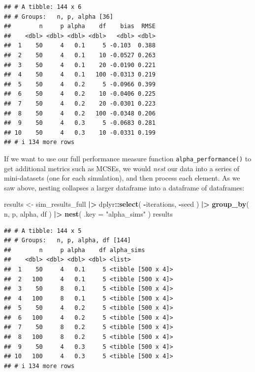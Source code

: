 \documentclass[
]{book}
\newenvironment{Shaded}{\begin{snugshade}}{\end{snugshade}}
\newcommand{\AttributeTok}[1]{\textcolor[rgb]{0.13,0.29,0.53}{#1}}
\newcommand{\FunctionTok}[1]{\textcolor[rgb]{0.13,0.29,0.53}{\textbf{#1}}}
\newcommand{\NormalTok}[1]{#1}
\newcommand{\OtherTok}[1]{\textcolor[rgb]{0.56,0.35,0.01}{#1}}
\newcommand{\SpecialCharTok}[1]{\textcolor[rgb]{0.81,0.36,0.00}{\textbf{#1}}}
\newcommand{\StringTok}[1]{\textcolor[rgb]{0.31,0.60,0.02}{#1}}
\begin{document}
\begin{verbatim}
## # A tibble: 144 x 6
## # Groups:   n, p, alpha [36]
##        n     p alpha    df    bias  RMSE
##    <dbl> <dbl> <dbl> <dbl>   <dbl> <dbl>
##  1    50     4   0.1     5 -0.103  0.388
##  2    50     4   0.1    10 -0.0527 0.263
##  3    50     4   0.1    20 -0.0190 0.221
##  4    50     4   0.1   100 -0.0313 0.219
##  5    50     4   0.2     5 -0.0966 0.399
##  6    50     4   0.2    10 -0.0406 0.225
##  7    50     4   0.2    20 -0.0301 0.223
##  8    50     4   0.2   100 -0.0348 0.206
##  9    50     4   0.3     5 -0.0683 0.281
## 10    50     4   0.3    10 -0.0331 0.199
## # i 134 more rows
\end{verbatim}

If we want to use our full performance measure function \texttt{alpha\_performance()} to get additional metrics such as MCSEs, we would \emph{nest} our data into a series of mini-datasets (one for each simulation), and then process each element.
As we saw above, nesting collapses a larger dataframe into a dataframe of dataframes:

\begin{Shaded}
\begin{Highlighting}[]
\NormalTok{results }\OtherTok{\textless{}{-}}\NormalTok{ sim\_results\_full }\SpecialCharTok{|\textgreater{}}
\NormalTok{  dplyr}\SpecialCharTok{::}\FunctionTok{select}\NormalTok{( }\SpecialCharTok{{-}}\NormalTok{iterations, }\SpecialCharTok{{-}}\NormalTok{seed ) }\SpecialCharTok{|\textgreater{}}
  \FunctionTok{group\_by}\NormalTok{( n, p, alpha, df ) }\SpecialCharTok{|\textgreater{}}
  \FunctionTok{nest}\NormalTok{( }\AttributeTok{.key =} \StringTok{"alpha\_sims"}\NormalTok{ )}
\NormalTok{results}
\end{Highlighting}
\end{Shaded}

\begin{verbatim}
## # A tibble: 144 x 5
## # Groups:   n, p, alpha, df [144]
##        n     p alpha    df alpha_sims        
##    <dbl> <dbl> <dbl> <dbl> <list>            
##  1    50     4   0.1     5 <tibble [500 x 4]>
##  2   100     4   0.1     5 <tibble [500 x 4]>
##  3    50     8   0.1     5 <tibble [500 x 4]>
##  4   100     8   0.1     5 <tibble [500 x 4]>
##  5    50     4   0.2     5 <tibble [500 x 4]>
##  6   100     4   0.2     5 <tibble [500 x 4]>
##  7    50     8   0.2     5 <tibble [500 x 4]>
##  8   100     8   0.2     5 <tibble [500 x 4]>
##  9    50     4   0.3     5 <tibble [500 x 4]>
## 10   100     4   0.3     5 <tibble [500 x 4]>
## # i 134 more rows
\end{verbatim}
\end{document}
